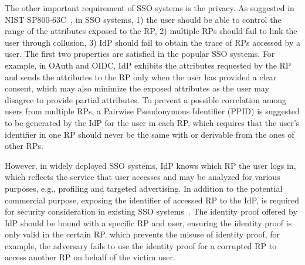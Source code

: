 

The other important requirement of SSO systems is the privacy. As suggested in NIST SP800-63C~\cite{NIST2017draft}, in SSO systems,
1) the user should be able to control the range of the attributes exposed to the RP, 2) multiple RPs should fail to link the user through collusion, 3) IdP should fail to obtain the trace of RPs accessed by a user. The first two properties are satisfied in the popular SSO systems. For example, in OAuth and OIDC, IdP exhibits the  attributes requested by the RP and sends the attributes to the RP only when the user has provided a clear consent, which may also minimize the exposed attributes as the user may disagree to provide partial attributes. To prevent a possible correlation among users from multiple RPs, a Pairwise Pseudonymous Identifier (PPID) is suggested to be generated by the IdP for the user in each RP, which requires that  the user's identifier in one RP should never be the same with or derivable from the ones of other RPs.



However, in widely deployed SSO systems, IdP knows which RP the user logs in, which reflects the service that user accesses and may be analyzed for various purposes, e.g., profiling and targeted advertising. In addition to the potential commercial purpose, exposing the 
identifier of accessed RP to the IdP, is required  for security consideration in existing SSO systems~\cite{ChenPCTKT14}. The identity proof offered by IdP should be bound with a specific RP and user, ensuring the identity proof is only valid in the certain RP, which prevents the misuse of identity proof, for example, the adversary fails to  use the identity proof for a corrupted RP to  access another RP on behalf of the victim user.




